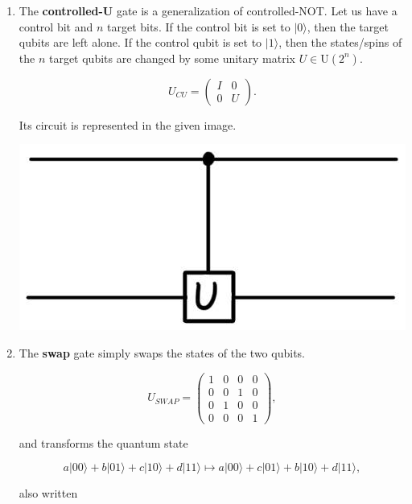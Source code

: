 \documentclass{article}
\theoremstyle{definition}
\begin{document}
\begin{enumerate}
      \item The \textbf{controlled-U} gate is a generalization of controlled-NOT. Let us have a control bit and $n$ target bits. If the control bit is set to $|0 \rangle$, then the target qubits are left alone. If the control qubit is set to $|1\rangle$, then the states/spins of the $n$ target qubits are changed by some unitary matrix $U \in \text{U}(2^n)$.

        \[U_{CU} = \begin{pmatrix} I & 0 \\ 0 & U \end{pmatrix}.\]

      Its circuit is represented in the given image.

      \begin{center}
        \includegraphics[scale=0.3]{img/Control_U_gate.jpg}
      \end{center}

      \item The \textbf{swap} gate simply swaps the states of the two qubits.

          \[U_{SWAP} = \begin{pmatrix} 1&0&0&0\\0&0&1&0\\0&1&0&0\\0&0&0&1 \end{pmatrix},\]

        and transforms the quantum state

          \[a |00\rangle + b |01\rangle + c|10\rangle + d|11\rangle \mapsto a |00\rangle + c |01\rangle + b|10\rangle + d|11\rangle,\]

        also written


\end{enumerate}
\end{document}
